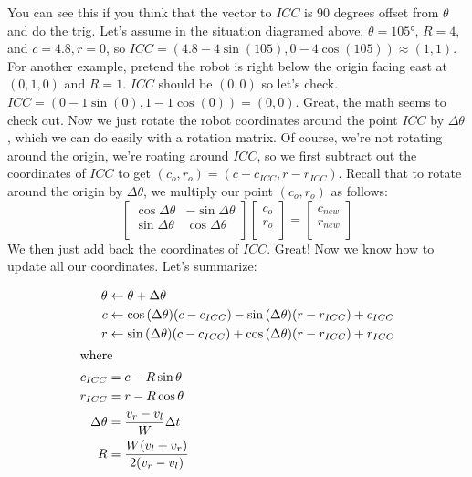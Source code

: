 \documentclass{article}
\begin{document}
You can see this if you think that the vector to $ICC$ is 90 degrees offset from $\theta$ and do the trig. Let's assume in the situation diagramed above, $\theta=\ang{105}$, $R=4$, and $c=4.8, r=0$, so $ICC = (4.8-4\sin{(105)}, 0-4\cos{(105)}) \approx (1, 1)$. For another example, pretend the robot is right below the origin facing east at $(0,1,0)$ and $R=1$. $ICC$ should be $(0,0)$ so let's check. $ICC = (0-1\sin{(0)}, 1-1\cos{(0)}) = (0, 0).$ Great, the math seems to check out. Now we just rotate the robot coordinates around the point $ICC$ by $\Delta\theta$, which we can do easily with a rotation matrix. Of course, we're not rotating around the origin, we're roating around $ICC$, so we first subtract out the coordinates of $ICC$ to get $(c_o, r_o) = (c-c_{ICC}, r-r_{ICC})$. Recall that to rotate around the origin by $\Delta\theta$, we multiply our point $(c_o, r_o)$ as follows:
\begin{equation}
  \begin{bmatrix}
    \cos{\Delta\theta} & -\sin{\Delta\theta} \\
    \sin{\Delta\theta} & \cos{\Delta\theta} \\
  \end{bmatrix}
  \begin{bmatrix}
    c_o \\
    r_o \\
  \end{bmatrix}
  =
  \begin{bmatrix}
    c_{new} \\
    r_{new} \\
  \end{bmatrix}
\end{equation}
We then just add back the coordinates of $ICC$. Great! Now we know how to update all our coordinates. Let's summarize:

\begin{align}
 \theta &\leftarrow \theta + \Delta\theta \\
  c &\leftarrow \cos{(\Delta\theta)}(c-c_{ICC})-\sin{(\Delta\theta)}(r-r_{ICC}) + c_{ICC} \\
  r &\leftarrow \sin{(\Delta\theta)}(c-c_{ICC})+\cos{(\Delta\theta)}(r-r_{ICC}) + r_{ICC} \\
\shortintertext{where}
  c_{ICC} &= c-R\sin{\theta} \\
  r_{ICC} &= r-R\cos{\theta} \\
  \Delta\theta &= \frac{v_r-v_l}{W}\Delta t \\
  R &= \frac{W(v_l+v_r)}{2(v_r-v_l)}
\end{align}
\end{document}
